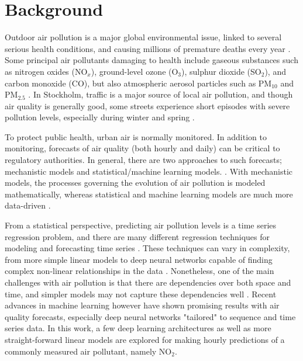 
\section{Background}

Outdoor air pollution is a major global environmental issue, linked to several serious health conditions, and causing millions of premature deaths every year \cite{who2016}. Some principal air pollutants damaging to health include gaseous substances such as nitrogen oxides (NO$_x$), ground-level ozone (O$_3$), sulphur dioxide (SO$_2$), and carbon monoxide (CO), but also atmospheric aerosol particles such as PM$_{10}$ and PM$_{2.5}$ \cite{VanLoon2010}. In Stockholm, traffic is a major source of local air pollution, and though air quality is generally good, some streets experience short episodes with severe pollution levels, especially during winter and spring \cite{slbanalys}. %

To protect public health, urban air is normally monitored. In addition to monitoring, forecasts of air quality (both hourly and daily) can be critical to regulatory authorities. In general, there are two approaches to such forecasts; mechanistic models and statistical/machine learning models. \cite{ElHarbawi2013, Liao2020, atmos7020015}. %
With mechanistic models, the processes governing the evolution of air pollution is modeled mathematically, whereas statistical and machine learning models are much more data-driven \cite{atmos7020015}. 

From a statistical perspective, predicting air pollution levels is a time series regression problem, and there are many different regression techniques for modeling and forecasting time series \cite{atmos7020015}. These techniques can vary in complexity, from more simple linear models to deep neural networks capable of finding complex non-linear relationships in the data \cite{atmos7020015, LeCun2015}. Nonetheless, one of the main challenges with air pollution is that there are dependencies over both space and time, and simpler models may not capture these dependencies well \cite{Liao2020}. Recent advances in machine learning however have shown promising results with air quality forecasts, especially deep neural networks "tailored" to sequence and time series data\cite{Liao2020, atmos7020015}. In this work, a few deep learning architectures as well as more straight-forward linear models are explored for making hourly predictions of a commonly measured air pollutant, namely NO$_2$.  

